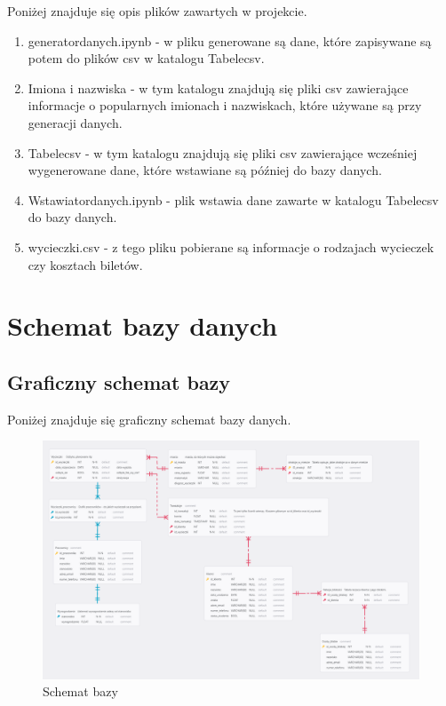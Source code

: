 \documentclass{article}
\begin{document}
	Poniżej znajduje się opis plików zawartych w projekcie.
	\begin{enumerate}
		\item generator\textunderscore danych.ipynb - w pliku generowane są dane, które zapisywane są potem do plików csv w katalogu Tabele\textunderscore csv.
		\item Imiona i nazwiska - w tym katalogu znajdują się pliki csv zawierające informacje o popularnych imionach i nazwiskach, które używane są przy generacji danych.
		\item Tabele\textunderscore csv - w tym katalogu znajdują się pliki csv zawierające wcześniej wygenerowane dane, które wstawiane są później do bazy danych.
		\item Wstawiator\textunderscore danych.ipynb - plik wstawia dane zawarte w katalogu Tabele\textunderscore csv do bazy danych.
		\item wycieczki.csv - z tego pliku pobierane są informacje o rodzajach wycieczek czy kosztach biletów.
		
	\end{enumerate}
	
	\section{Schemat bazy danych}
	
	\subsection{Graficzny schemat bazy}
	
	Poniżej znajduje się graficzny schemat bazy danych.
	
	\begin{figure}[H]
		\centering
		\includegraphics[scale=0.2]{diagram.PNG}
		\caption{Schemat bazy}
	\end{figure}
	
\end{document}

